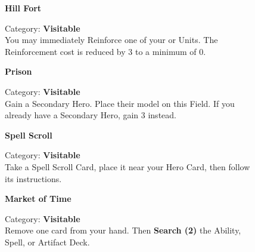 \begin{figure}[H]
  \begin{minipage}[t]{0.47\textwidth}
    \vspace{0pt}
    \centering
    \phantom{j}\textbf{Hill Fort}\par
    \caption{\small Category: \textbf{Visitable}\\
      You may immediately Reinforce one of your  or  Units.
      The Reinforcement cost is reduced by 3  to a minimum of 0.}
  \end{minipage}\hfill
  \begin{minipage}[t]{0.47\textwidth}
    \vspace{0pt}
    \centering
    \phantom{j}\textbf{Prison}\par
    \caption{\small Category: \textbf{Visitable}\\
      Gain a Secondary Hero.
      Place their model on this Field.
      If you already have a Secondary Hero, gain 3  instead.}
  \end{minipage}
\end{figure}

\begin{figure}[H]
  \begin{minipage}[t]{0.47\textwidth}
    \vspace{0pt}
    \centering
    \textbf{Spell Scroll}\par
    \caption{\small Category: \textbf{Visitable}\\
      Take a Spell Scroll Card, place it near your Hero Card, then follow its instructions.
    }
  \end{minipage}\hfill
  \begin{minipage}[t]{0.47\textwidth}
    \vspace{0pt}
    \centering
    \phantom{j}\textbf{Market of Time}\phantom{j}\par
    \caption{\small Category: \textbf{Visitable}\\ Remove one card from your hand.
      Then \textbf{Search (2)} the Ability, Spell, or Artifact Deck.
    }
  \end{minipage}
\end{figure}

